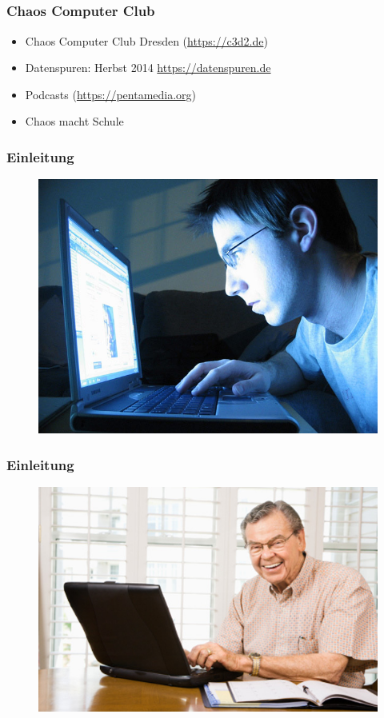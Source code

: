\documentclass[12pt]{beamer}
\begin{document}
\subsection{}
\begin{frame}
    \frametitle{Chaos Computer Club}
    \begin{itemize}
      \item<1-> Chaos Computer Club Dresden (\url{https://c3d2.de})
          \note{}
      \item<2-> Datenspuren: Herbst 2014 \url{https://datenspuren.de}
      \item<3-> Podcasts (\url{https://pentamedia.org})
      \item<4-> Chaos macht Schule
    \end{itemize}
\end{frame}

\begin{frame}
  \frametitle{Einleitung}
  \begin{figure}
    \includegraphics[height=0.7\textheight]{img/internet_user1.jpg}
  \end{figure}
\end{frame}

\begin{frame}
  \frametitle{Einleitung}
  \begin{figure}
    \includegraphics[height=0.7\textheight]{img/internet_user3.jpg}
  \end{figure}
\end{frame}
\end{document}
